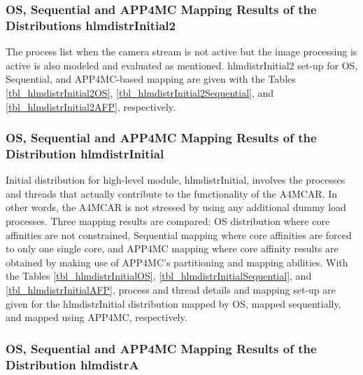\hlmdistrInitialOS

\hlmdistrInitialSequential

\hlmdistrInitialAFP

\subsubsection{OS, Sequential and APP4MC Mapping Results of the Distributions hlmdistrInitial2}

The process list when the camera stream is not active but the image processing is active is also modeled and evaluated as mentioned. hlmdistrInitial2 set-up for OS, Sequential, and APP4MC-based mapping are given with the Tables \ref{tbl_hlmdistrInitial2OS}, \ref{tbl_hlmdistrInitial2Sequential}, and \ref{tbl_hlmdistrInitial2AFP}, respectively.

\hlmdistrInitialTOS

\hlmdistrInitialTSequential

\hlmdistrInitialTAFP

\subsubsection{OS, Sequential and APP4MC Mapping Results of the Distribution hlmdistrInitial}

Initial distribution for high-level module, hlmdistrInitial, involves the processes and threads that actually contribute to the functionality of the A4MCAR. In other words, the A4MCAR is not stressed by using any additional dummy load processes. Three mapping results are compared: OS distribution where core affinities are not constrained, Sequential mapping where core affinities are forced to only one single core, and APP4MC mapping where core affinity results are obtained by making use of APP4MC's partitioning and mapping abilities. With the Tables \ref{tbl_hlmdistrInitialOS}, \ref{tbl_hlmdistrInitialSequential}, and \ref{tbl_hlmdistrInitialAFP}, process and thread details and mapping set-up are given for the hlmdistrInitial distribution mapped by OS, mapped sequentially, and mapped using APP4MC, respectively.

\hlmdistrInitialOS

\hlmdistrInitialSequential

\hlmdistrInitialAFP

\subsubsection{OS, Sequential and APP4MC Mapping Results of the Distribution hlmdistrA}

